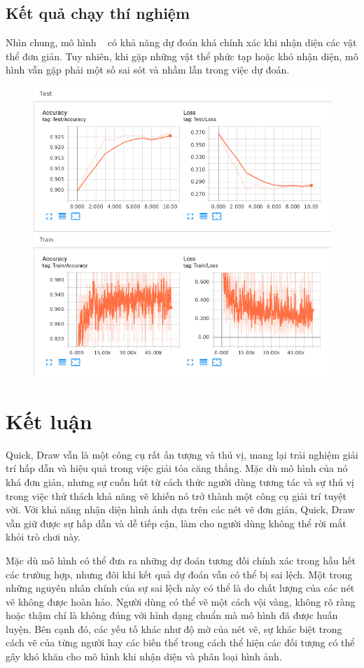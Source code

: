 \begin{itemize}
\subsection{Kết quả chạy thí nghiệm}

Nhìn chung, mô hình ~\cite{github} có khả năng dự đoán khá chính xác khi nhận diện các vật thể đơn giản. Tuy nhiên, khi gặp những vật thể phức tạp hoặc khó nhận diện, mô hình vẫn gặp phải một số sai sót và nhầm lẫn trong việc dự đoán.

\begin{figure}[H]  %
\centering
\includegraphics[width=0.75\linewidth]{Chapter2/Accuracy.png}
\label{fig:baitoan}
\end{figure}

\section{Kết luận}

Quick, Draw vẫn là một công cụ rất ấn tượng và thú vị, mang lại trải nghiệm giải trí hấp dẫn và hiệu quả trong việc giải tỏa căng thẳng. Mặc dù mô hình của nó khá đơn giản, nhưng sự cuốn hút từ cách thức người dùng tương tác và sự thú vị trong việc thử thách khả năng vẽ khiến nó trở thành một công cụ giải trí tuyệt vời. Với khả năng nhận diện hình ảnh dựa trên các nét vẽ đơn giản, Quick, Draw vẫn giữ được sự hấp dẫn và dễ tiếp cận, làm cho người dùng không thể rời mắt khỏi trò chơi này.

Mặc dù mô hình có thể đưa ra những dự đoán tương đối chính xác trong hầu hết các trường hợp, nhưng đôi khi kết quả dự đoán vẫn có thể bị sai lệch. Một trong những nguyên nhân chính của sự sai lệch này có thể là do chất lượng của các nét vẽ không được hoàn hảo. Người dùng có thể vẽ một cách vội vàng, không rõ ràng hoặc thậm chí là không đúng với hình dạng chuẩn mà mô hình đã được huấn luyện. Bên cạnh đó, các yếu tố khác như độ mờ của nét vẽ, sự khác biệt trong cách vẽ của từng người hay các biến thể trong cách thể hiện các đối tượng có thể gây khó khăn cho mô hình khi nhận diện và phân loại hình ảnh.


\end{itemize}
